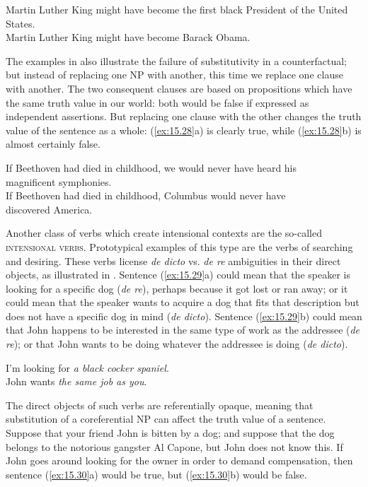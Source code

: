 \ea \label{ex:15.27}
\ea  Martin Luther King might have become the first black President of the United States.\\
\ex Martin Luther King might have become Barack Obama.
                       \z
\z


The examples in  also illustrate the failure of substitutivity in a counterfactual; but instead of replacing one NP with another, this time we replace one clause with another. The two consequent clauses are based on propositions which have the same truth value in our world: both would be false if expressed as independent assertions. But replacing one clause with the other changes the truth value of the sentence as a whole: (\ref{ex:15.28}a) is clearly true, while (\ref{ex:15.28}b) is almost certainly false.


\ea \label{ex:15.28}
\ea  If Beethoven had died in childhood, we would never have heard his\\
  magnificent symphonies.\\
\ex If Beethoven had died in childhood, Columbus would never have\\
  discovered America.
                       \z
\z


Another class of verbs which create intensional contexts are the so-called \textsc{intensional verbs}. Prototypical examples of this type are the verbs of searching and desiring. These verbs license \textit{de dicto} vs. \textit{de re} ambiguities in their direct objects, as illustrated in . Sentence (\ref{ex:15.29}a) could mean that the speaker is looking for a specific dog (\textit{de re}), perhaps because it got lost or ran away; or it could mean that the speaker wants to acquire a dog that fits that description but does not have a specific dog in mind (\textit{de dicto}). Sentence (\ref{ex:15.29}b) could mean that John happens to be interested in the same type of work as the addressee (\textit{de re}); or that John wants to be doing whatever the addressee is doing (\textit{de dicto}).


\ea \label{ex:15.29}
\ea  I’m looking for \textit{a black cocker spaniel}.\\
\ex John wants \textit{the same job as you}.
                       \z
\z


The direct objects of such verbs are referentially opaque, meaning that substitution of a coreferential NP can affect the truth value of a sentence. Suppose that your friend John is bitten by a dog; and suppose that the dog belongs to the notorious gangster Al Capone, but John does not know this. If John goes around looking for the owner in order to demand compensation, then sentence (\ref{ex:15.30}a) would be true, but (\ref{ex:15.30}b) would be false.


